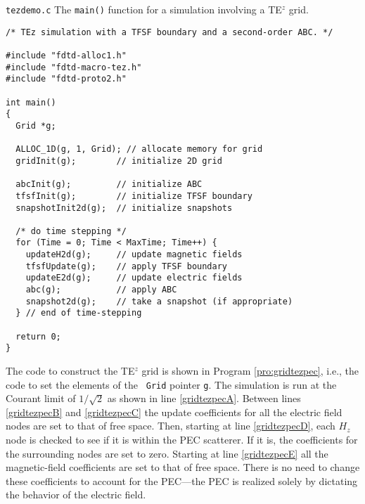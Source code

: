 \begin{program}
{\tt tezdemo.c} The {\tt main()} function for a simulation involving a
TE$^z$ grid.
\label{pro:tezdemo}
\codemiddle
\begin{lstlisting}
/* TEz simulation with a TFSF boundary and a second-order ABC. */

#include "fdtd-alloc1.h"
#include "fdtd-macro-tez.h" 
#include "fdtd-proto2.h"

int main()
{
  Grid *g;

  ALLOC_1D(g, 1, Grid); // allocate memory for grid
  gridInit(g);        // initialize 2D grid

  abcInit(g);         // initialize ABC
  tfsfInit(g);        // initialize TFSF boundary
  snapshotInit2d(g);  // initialize snapshots

  /* do time stepping */
  for (Time = 0; Time < MaxTime; Time++) {
    updateH2d(g);     // update magnetic fields 
    tfsfUpdate(g);    // apply TFSF boundary
    updateE2d(g);     // update electric fields 
    abc(g);           // apply ABC
    snapshot2d(g);    // take a snapshot (if appropriate)
  } // end of time-stepping

  return 0;
}
\end{lstlisting}
\end{program}

The code to construct the TE$^z$ grid is shown in Program
\ref{pro:gridtezpec}, i.e., the code to set the elements of the {\tt
Grid} pointer {\tt g}.  The simulation is run at the Courant limit of
$1/\sqrt{2}$ as shown in line \ref{gridtezpecA}.  Between lines
\ref{gridtezpecB} and \ref{gridtezpecC} the update coefficients for
all the electric field nodes are set to that of free space.  Then,
starting at line \ref{gridtezpecD}, each $H_z$ node is checked to see
if it is within the PEC scatterer.  If it is, the coefficients for the
surrounding nodes are set to zero.  Starting at line \ref{gridtezpecE}
all the magnetic-field coefficients are set to that of free space.
There is no need to change these coefficients to account for the
PEC---the PEC is realized solely by dictating the behavior of the
electric field.

